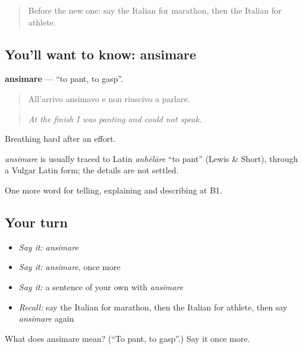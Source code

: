 \label{lesson:IT-C513-ansimare}



\begin{quote}
Before the new one: say the Italian for marathon, then the Italian for athlete.
\end{quote}

\subsection*{You'll want to know: ansimare}
\textbf{ansimare} — \textquotedblleft{}to pant, to gasp\textquotedblright{}.

\begin{quote}
All'arrivo ansimavo e non riuscivo a parlare.
\end{quote}

\begin{quote}
\emph{At the finish I was panting and could not speak.}
\end{quote}

Breathing hard after an effort.

\begin{cousinweb}
\emph{ansimare} is usually traced to Latin \emph{anhēlāre} \textquotedblleft{}to pant\textquotedblright{} (Lewis \& Short), through a Vulgar Latin form; the details are not settled.
\end{cousinweb}

\begin{grammarlens}[title={What you've built}]
One more word for telling, explaining and describing at B1.
\end{grammarlens}

\subsection*{Your turn}
\begin{itemize}
\raggedright
  \item \emph{Say it:} \emph{ansimare}
  \item \emph{Say it:} \emph{ansimare}, once more
  \item \emph{Say it:} a sentence of your own with \emph{ansimare}
  \item \emph{Recall:} say the Italian for marathon, then the Italian for athlete, then say \emph{ansimare} again
\end{itemize}

\begin{tcolorbox}[breakable,colback=teal!4,colframe=teal!35!black,title={Before you move on}]
What does ansimare mean? (\textquotedblleft{}To pant, to gasp\textquotedblright{}.) Say it once more.
\end{tcolorbox}
